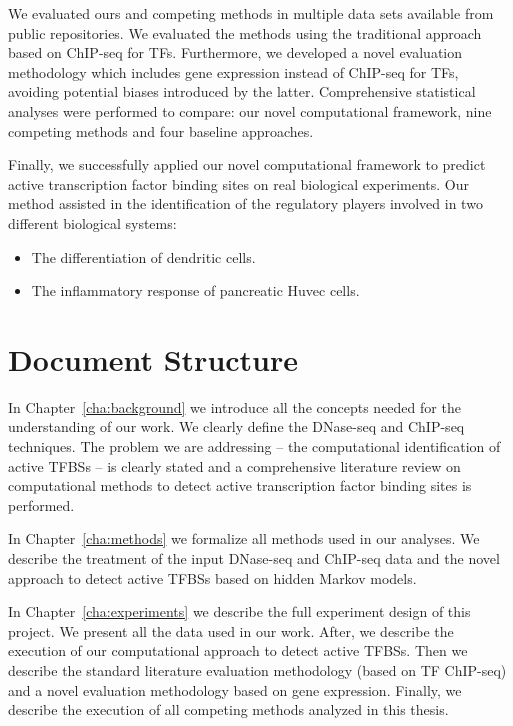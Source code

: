 We evaluated ours and competing methods in multiple data sets available from public repositories. We evaluated the methods using the traditional approach based on ChIP-seq for TFs. Furthermore, we developed a novel evaluation methodology which includes gene expression instead of ChIP-seq for TFs, avoiding potential biases introduced by the latter. Comprehensive statistical analyses were performed to compare: our novel computational framework, nine competing methods and four baseline approaches.

Finally, we successfully applied our novel computational framework to predict active transcription factor binding sites on real biological experiments. Our method assisted in the identification of the regulatory players involved in two different biological systems:
\begin{itemize}
\item The differentiation of dendritic cells.
\item The inflammatory response of pancreatic Huvec cells.
\end{itemize}

\section{Document Structure}
\label{sec:document.structure}

In Chapter~\ref{cha:background} we introduce all the concepts needed for the understanding of our work. We clearly define the DNase-seq and ChIP-seq techniques. The problem we are addressing -- the computational identification of active TFBSs -- is clearly stated and a comprehensive literature review on computational methods to detect active transcription factor binding sites is performed.

In Chapter~\ref{cha:methods} we formalize all methods used in our analyses. We describe the treatment of the input DNase-seq and ChIP-seq data and the novel approach to detect active TFBSs based on hidden Markov models.

In Chapter~\ref{cha:experiments} we describe the full experiment design of this project. We present all the data used in our work. After, we describe the execution of our computational approach to detect active TFBSs. Then we describe the standard literature evaluation methodology (based on TF ChIP-seq) and a novel evaluation methodology based on gene expression. Finally, we describe the execution of all competing methods analyzed in this thesis.

